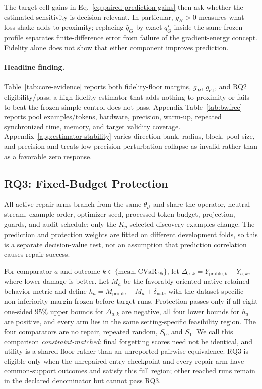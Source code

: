 The target-cell gains in Eq.~\eqref{eq:paired-prediction-gains} then ask
whether the estimated sensitivity is decision-relevant. In particular,
$g_H>0$ measures what loss-shake adds to proximity; replacing
$\widehat q_G$ by exact $q_G^\star$ inside the same frozen profile separates
finite-difference error from failure of the gradient-energy concept.
Fidelity alone does not show that either component improves prediction.

\paragraph{Headline finding.}
{\setlength{\emergencystretch}{3em}\FidelityHeadline\par}

Table~\ref{tab:core-evidence} reports both fidelity-floor margins, $g_H$,
$g_{\mathrm{ctl}}$, and RQ2 eligibility/pass; a high-fidelity estimator that
adds nothing to proximity or fails to beat the frozen simple control does not
pass.
Appendix Table~\ref{tab:bwfree} reports pool examples/tokens, hardware,
precision, warm-up, repeated synchronized time, memory, and target validity
coverage. Appendix~\ref{app:estimator-stability} varies direction bank,
radius, block, pool size, and precision and treats low-precision perturbation
collapse as invalid rather than as a favorable zero response.

\subsection{RQ3: Fixed-Budget Protection}
\label{sec:exp-protection}
\label{sec:exp-alpha}

All active repair arms branch from the same $\theta_{t^\dagger}$ and share the
operator, neutral stream, example order, optimizer seed, processed-token
budget, projection, guards, and audit schedule; only the $K_p$ selected
discovery examples change. The prediction and protection weights are fitted
on different development folds, so this is a separate decision-value test,
not an assumption that prediction correlation causes repair success.

For comparator $a$ and outcome
$k\in\{\mathrm{mean},\mathrm{CVaR}_{.95}\}$, let
$\Delta_{a,k}=Y_{\mathrm{profile},k}-Y_{a,k}$, where lower damage is better.
Let $M_a$ be the favorably oriented native retained-behavior metric and define
$h_a=M_{\mathrm{profile}}-M_a+\delta_{\mathrm{nat}}$, with the dataset-specific
non-inferiority margin frozen before target runs. Protection passes only if
all eight one-sided 95\% upper bounds for $\Delta_{a,k}$ are negative, all four
lower bounds for $h_a$ are positive, and every arm lies in the same
setting-specific feasibility region. The four comparators are no repair,
repeated random, $S_0$, and $S_1$. We call this comparison
\emph{constraint-matched}: final forgetting scores need not be identical, and
utility is a shared floor rather than an unreported pairwise equivalence.
RQ3 is eligible only when the unrepaired entry checkpoint and every repair arm
have common-support outcomes and satisfy this full region; other reached runs
remain in the declared denominator but cannot pass RQ3.

